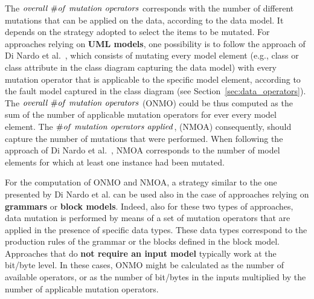 The $\mathit{overall}\ \# \mathit{of}\ \mathit{mutation} \ \mathit{operators}$ corresponds with the number of different mutations that can be applied on the data, according to the data model. It depends on the strategy adopted to select the items to be mutated.
For approaches relying on \textbf{UML models}, one possibility is to follow the approach of Di Nardo et al.~\cite{di2015generating}, which consists of mutating every model element (e.g., class or class attribute in the class diagram capturing the data model) with every mutation operator that is applicable to the specific model element, according to the fault model captured in the class diagram (see Section~\ref{sec:data_operators}).
The $\mathit{overall}\ \# \mathit{of}\ \mathit{mutation} \ \mathit{operators}$ (ONMO) could be thus computed as the sum of the number of applicable mutation operators for ever every model element.
The $\# \mathit{of}\ \mathit{mutation} \ \mathit{operators} \ \mathit{applied}$, (NMOA) consequently, should capture the number of mutations that were performed. When following the approach of Di Nardo et al.~\cite{di2015generating}, NMOA corresponds to the number of model elements for which at least one instance had been mutated. 

For the computation of ONMO and NMOA, a strategy similar to the one presented by Di Nardo et al. can be used also in the case of approaches relying on \textbf{grammars} or \textbf{block models}. Indeed, also for these two types of approaches, data mutation is performed by means of a set of mutation operators that are applied in the presence of specific data types. 
These data types correspond to the production rules of the grammar or the blocks defined in the block model. 
Approaches that do \textbf{not require an input model} typically work at the bit/byte level. In these cases, ONMO might be calculated as the number of available operators, or
as the number of bit/bytes in the inputs multiplied by the number of applicable mutation operators.

